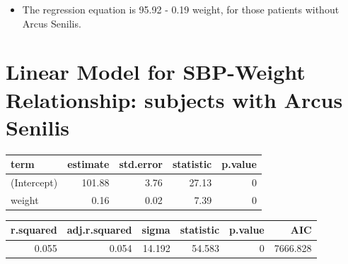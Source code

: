 \documentclass[
]{book}
\newenvironment{Shaded}{\begin{snugshade}}{\end{snugshade}}
\newcommand{\DataTypeTok}[1]{\textcolor[rgb]{0.13,0.29,0.53}{#1}}
\newcommand{\DecValTok}[1]{\textcolor[rgb]{0.00,0.00,0.81}{#1}}
\newcommand{\KeywordTok}[1]{\textcolor[rgb]{0.13,0.29,0.53}{\textbf{#1}}}
\newcommand{\NormalTok}[1]{#1}
\newcommand{\OperatorTok}[1]{\textcolor[rgb]{0.81,0.36,0.00}{\textbf{#1}}}
\newcommand{\StringTok}[1]{\textcolor[rgb]{0.31,0.60,0.02}{#1}}
\providecommand{\tightlist}{%
  \setlength{\itemsep}{0pt}\setlength{\parskip}{0pt}}
\begin{document}
\begin{itemize}
\tightlist
\item
  The regression equation is 95.92 - 0.19 weight, for those patients without Arcus Senilis.
\end{itemize}

\hypertarget{linear-model-for-sbp-weight-relationship-subjects-with-arcus-senilis}{%
\section{Linear Model for SBP-Weight Relationship: subjects with Arcus Senilis}\label{linear-model-for-sbp-weight-relationship-subjects-with-arcus-senilis}}

\begin{Shaded}
\end{Shaded}

\begin{tabular}{l|r|r|r|r}
\hline
term & estimate & std.error & statistic & p.value\\
\hline
(Intercept) & 101.88 & 3.76 & 27.13 & 0\\
\hline
weight & 0.16 & 0.02 & 7.39 & 0\\
\hline
\end{tabular}

\begin{Shaded}
\end{Shaded}

\begin{tabular}{r|r|r|r|r|r}
\hline
r.squared & adj.r.squared & sigma & statistic & p.value & AIC\\
\hline
0.055 & 0.054 & 14.192 & 54.583 & 0 & 7666.828\\
\hline
\end{tabular}
\end{document}
